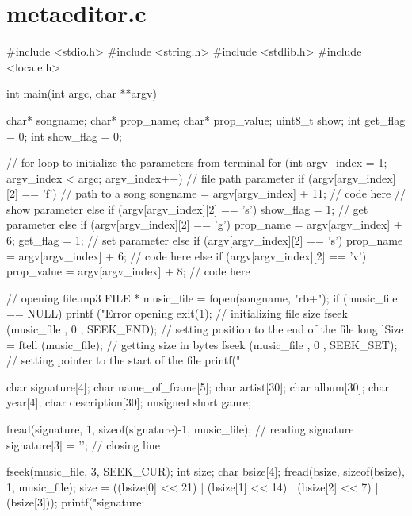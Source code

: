 \documentclass[a4paper,14pt]{article}
\begin{document}
\section{metaeditor.c}
\begin{python}
#include <stdio.h>
#include <string.h>
#include <stdlib.h>
#include <locale.h>



int main(int argc, char **argv)
{
    char* songname;
    char* prop_name;
    char* prop_value;
    uint8_t show;
    int get_flag = 0;
    int show_flag = 0;

    // for loop to initialize the parameters from terminal
    for (int argv_index = 1; argv_index < argc; argv_index++)
    {
        // file path parameter
        if (argv[argv_index][2] == 'f')
        {
            // path to a song
            songname = argv[argv_index] + 11;
            // code here
        }
        // show parameter
        else if (argv[argv_index][2] == 's')
        {
            show_flag = 1;
        }
        // get parameter
        else if (argv[argv_index][2] == 'g')
        {
            prop_name = argv[argv_index] + 6;
            get_flag = 1;
        }
        // set parameter
        else if (argv[argv_index][2] == 's')
        {
            prop_name = argv[argv_index] + 6;
            // code here
        }
        else if (argv[argv_index][2] == 'v')
        {
            prop_value = argv[argv_index] + 8;
            // code here
        }
    }

    // opening file.mp3
    FILE * music_file = fopen(songname, "rb+");
    if (music_file == NULL)
    {
        printf ("Error opening %
        exit(1);
    }
    // initializing file size
    fseek (music_file , 0 , SEEK_END);  // setting position to the end of the file
    long lSize = ftell (music_file);    // getting size in bytes
    fseek (music_file , 0 , SEEK_SET); // setting pointer to the start of the file
    printf("%

    char signature[4];
    char name_of_frame[5];
    char artist[30];
    char album[30];
    char year[4];
    char description[30];
    unsigned short ganre;

    fread(signature, 1, sizeof(signature)-1, music_file); // reading signature
    signature[3] = '\0'; // closing line

    fseek(music_file, 3, SEEK_CUR);
    int size;
    char bsize[4];
    fread(bsize, sizeof(bsize), 1, music_file);
    size = ((bsize[0] << 21) | (bsize[1] << 14) | (bsize[2] << 7) | (bsize[3]));
    printf("signature: %

}
\end{python}
\end{document}
